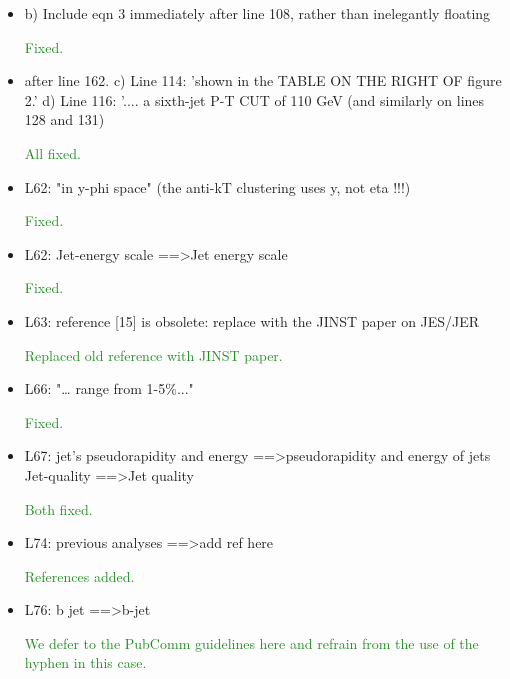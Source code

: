 \documentclass[paper=a4, fontsize=11pt]{scrartcl}
\begin{document}
\begin{itemize}
\item b) Include eqn 3 immediately after line 108, rather than inelegantly floating 

\textcolor{ForestGreen}{Fixed.}\\


\item after line 162. 
c) Line 114: 'shown in the TABLE ON THE RIGHT OF figure 2.' 
d) Line 116: '.... a sixth-jet P-T CUT of 110 GeV 
(and similarly on lines 128 and 131) 

\textcolor{ForestGreen}{All fixed.}\\


\item L62: 
"in y-phi space" (the anti-kT clustering uses y, not eta !!!) 

\textcolor{ForestGreen}{Fixed.}\\


\item L62: 
Jet-energy scale ==\textgreater Jet energy scale 

\textcolor{ForestGreen}{Fixed.}\\


\item L63: 
reference [15] is obsolete: replace with the JINST paper on JES/JER 

\textcolor{ForestGreen}{Replaced old reference with JINST paper.}\\


\item L66: 
"… range from 1-5\%..." 

\textcolor{ForestGreen}{Fixed.}\\


\item L67: 
jet’s pseudorapidity and energy ==\textgreater pseudorapidity and energy of jets 
Jet-quality ==\textgreater Jet quality 

\textcolor{ForestGreen}{Both fixed.}\\


\item L74: 
previous analyses ==\textgreater add ref here 

\textcolor{ForestGreen}{References added.}\\


\item L76: 
b jet ==\textgreater b-jet 

\textcolor{ForestGreen}{We defer to the PubComm guidelines here and refrain from the use of the hyphen
in this case.}\\



\end{itemize}
\end{document}
